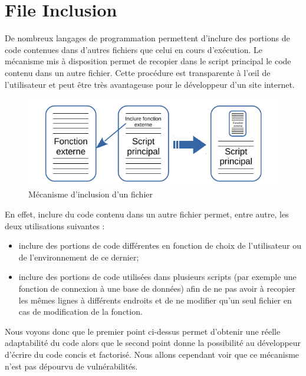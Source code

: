 
\newpage

\section{File Inclusion}
\label{fi}


De nombreux langages de programmation permettent d'inclure des portions de code contenues dans d'autres fichiers que celui en cours d'exécution. Le mécanisme mis à disposition permet de recopier dans le script principal le code contenu dans un autre fichier. Cette procédure est transparente à l'œil de l'utilisateur et peut être très avantageuse pour le développeur d'un site internet.

\begin{figure}[!h]
\begin{center}

\includegraphics[scale=1.2]{images/include.pdf}

\caption{Mécanisme d'inclusion d'un fichier}
\label{inclusion}
\end{center}
\end{figure}

En effet, inclure du code contenu dans un autre fichier permet, entre autre, les deux utilisations suivantes :
\begin{itemize}
\item inclure des portions de code différentes en fonction de choix de l'utilisateur ou de l'environnement de ce dernier;
\item inclure des portions de code utilisées dans plusieurs scripts (par exemple une fonction de connexion à une base de données) afin de ne pas avoir à recopier les mêmes lignes à différents endroits et de ne modifier qu'un seul fichier en cas de modification de la fonction.
\end{itemize}


Nous voyons donc que le premier point ci-dessus permet d'obtenir une réelle adaptabilité du code alors que le second point donne la possibilité au développeur d'écrire du code concis et factorisé. Nous allons cependant voir que ce mécanisme n'est pas dépourvu de vulnérabilités.


